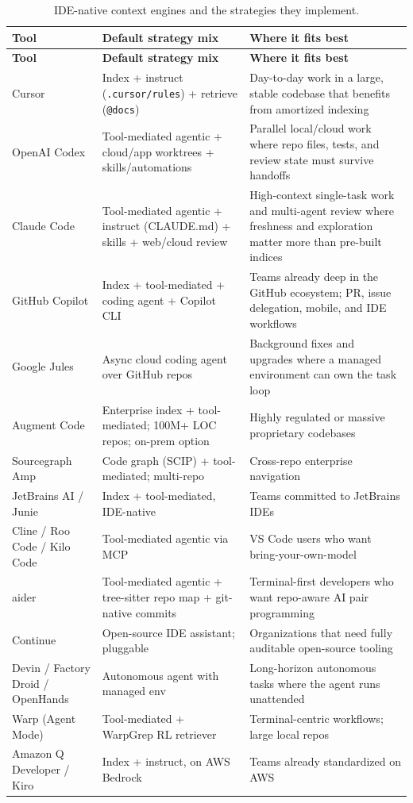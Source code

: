 \documentclass[
  11pt,
  letterpaper,
  numbers=noendperiod,
  parskip=half]{scrartcl}
\begin{document}
\begin{longtable}[]{@{}
  >{\raggedright\arraybackslash}p{}
  >{\raggedright\arraybackslash}p{}
  >{\raggedright\arraybackslash}p{}@{}}
\caption{IDE-native context engines and the strategies they
implement.}\label{tbl-tools-ide}\tabularnewline
\toprule\noalign{}
\textbf{Tool} & \textbf{Default strategy mix} & \textbf{Where it fits best}\\
\midrule\noalign{}
\endfirsthead
\toprule\noalign{}
\textbf{Tool} & \textbf{Default strategy mix} & \textbf{Where it fits best}\\
\midrule\noalign{}
\endhead
\bottomrule\noalign{}
\endlastfoot
Cursor & Index + instruct (\texttt{.cursor/rules}) + retrieve (\texttt{@docs}) & Day-to-day work in a large, stable codebase that benefits from amortized indexing\\
OpenAI Codex & Tool-mediated agentic + cloud/app worktrees + skills/automations & Parallel local/cloud work where repo files, tests, and review state must survive handoffs\\
Claude Code & Tool-mediated agentic + instruct (CLAUDE.md) + skills + web/cloud review & High-context single-task work and multi-agent review where freshness and exploration matter more than pre-built indices\\
GitHub Copilot & Index + tool-mediated + coding agent + Copilot CLI & Teams already deep in the GitHub ecosystem; PR, issue delegation, mobile, and IDE workflows\\
Google Jules & Async cloud coding agent over GitHub repos & Background fixes and upgrades where a managed environment can own the task loop\\
Augment Code & Enterprise index + tool-mediated; 100M+ LOC repos; on-prem option & Highly regulated or massive proprietary codebases\\
Sourcegraph Amp & Code graph (SCIP) + tool-mediated; multi-repo & Cross-repo enterprise navigation\\
JetBrains AI / Junie & Index + tool-mediated, IDE-native & Teams committed to JetBrains IDEs\\
Cline / Roo Code / Kilo Code & Tool-mediated agentic via MCP & VS Code users who want bring-your-own-model\\
aider & Tool-mediated agentic + tree-sitter repo map + git-native commits & Terminal-first developers who want repo-aware AI pair programming\\
Continue & Open-source IDE assistant; pluggable & Organizations that need fully auditable open-source tooling\\
Devin / Factory Droid / OpenHands & Autonomous agent with managed env & Long-horizon autonomous tasks where the agent runs unattended\\
Warp (Agent Mode) & Tool-mediated + WarpGrep RL retriever & Terminal-centric workflows; large local repos\\
Amazon Q Developer / Kiro & Index + instruct, on AWS Bedrock & Teams already standardized on AWS\\
\end{longtable}
\end{document}
